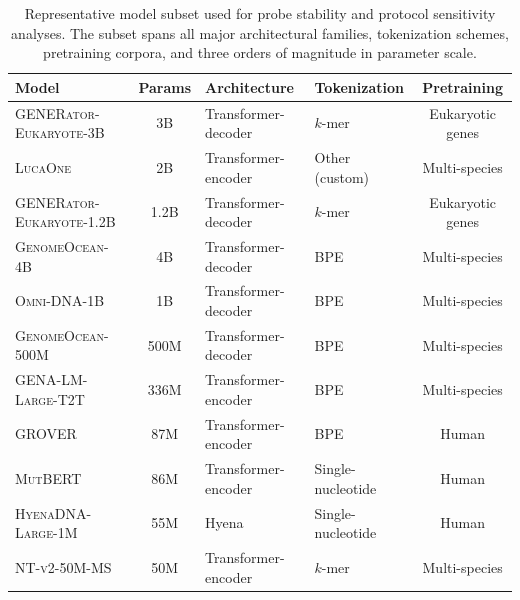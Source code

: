 \documentclass{llmxive}
\begin{document}
\begin{table}[!htbp]
\centering
\small
\begin{tabular}{@{}lcllc@{}}
\toprule
\textbf{Model} & \textbf{Params} & \textbf{Architecture} & \textbf{Tokenization} & \textbf{Pretraining} \\
\midrule
\textsc{GENERator-Eukaryote-3B}    & 3B    & Transformer-decoder & $k$-mer           & Eukaryotic genes \\
\textsc{LucaOne}                    & 2B    & Transformer-encoder & Other (custom)    & Multi-species \\
\textsc{GENERator-Eukaryote-1.2B}  & 1.2B  & Transformer-decoder & $k$-mer           & Eukaryotic genes \\
\textsc{GenomeOcean-4B}            & 4B    & Transformer-decoder & BPE               & Multi-species \\
\textsc{Omni-DNA-1B}                & 1B    & Transformer-decoder & BPE               & Multi-species \\
\textsc{GenomeOcean-500M}          & 500M  & Transformer-decoder & BPE               & Multi-species \\
\textsc{GENA-LM-Large-T2T}         & 336M  & Transformer-encoder & BPE               & Multi-species \\
\textsc{GROVER}                     & 87M   & Transformer-encoder & BPE               & Human \\
\textsc{MutBERT}                    & 86M   & Transformer-encoder & Single-nucleotide & Human \\
\textsc{HyenaDNA-Large-1M}         & 55M & Hyena               & Single-nucleotide & Human \\
\textsc{NT-v2-50M-MS}              & 50M   & Transformer-encoder & $k$-mer           & Multi-species \\
\bottomrule
\end{tabular}
\caption{Representative model subset used for probe stability and protocol
sensitivity analyses. The subset spans all major architectural families,
tokenization schemes, pretraining corpora, and three orders of magnitude
in parameter scale.}
\label{tab:stability_models}
\end{table}
\end{document}
